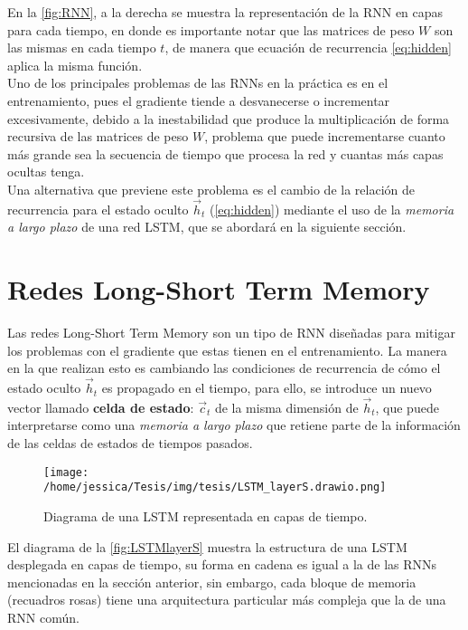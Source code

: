 En la \autoref{fig:RNN}, a la derecha se muestra la representación de la \acs{RNN} en capas para cada tiempo, en donde es importante notar que las matrices de peso $W$ son las mismas en cada tiempo $t$, de manera que ecuación de recurrencia \autoref{eq:hidden} aplica la misma función.
\\

Uno de los principales problemas de las \acp{RNN} en la práctica es en el entrenamiento, pues el gradiente tiende a desvanecerse o incrementar excesivamente, debido a la inestabilidad que produce la multiplicación de forma recursiva de las matrices de peso $W$, problema que puede incrementarse cuanto más grande sea la secuencia de tiempo que procesa la red y cuantas más capas ocultas tenga.
\\
Una alternativa que previene este problema es el cambio de la relación de recurrencia para el estado oculto $\vec{h}_t$ (\autoref{eq:hidden}) mediante el uso de la \emph{memoria a largo plazo} de una red \acs{LSTM}, que se abordará en la siguiente sección. \cite{Nielsen:2018}

\section{Redes Long-Short Term Memory}\label{sec:lstm}

Las redes Long-Short Term Memory son un tipo de \acs{RNN} diseñadas para mitigar los problemas con el gradiente que estas tienen en el entrenamiento. La manera en la que realizan esto es cambiando las condiciones de recurrencia de cómo el estado oculto $\vec{h}_t$ es propagado en el tiempo, para ello, se introduce un nuevo vector llamado \textbf{celda de estado}: $\vec{c}_{t}$ de la misma dimensión de $\vec{h}_t$, que puede interpretarse como una \emph{memoria a largo plazo} que retiene parte de la información de las celdas de estados de tiempos pasados. \cite{Nielsen:2018}

\begin{figure}[!htbp]
  \centering
  \texttt{[image: /home/jessica/Tesis/img/tesis/LSTM\_layerS.drawio.png]}
  \caption{Diagrama de una \acs{LSTM} representada en capas de tiempo.}
  \label{fig:LSTMlayerS}
\end{figure}

El diagrama de la \autoref{fig:LSTMlayerS} muestra la estructura de una \acs{LSTM} desplegada en capas de tiempo, su forma en cadena es igual a la de las \acp{RNN} mencionadas en la sección anterior, sin embargo, cada bloque de memoria (recuadros rosas) tiene una arquitectura particular más compleja que la de una \acs{RNN} común.

